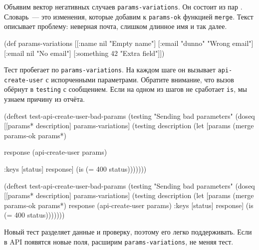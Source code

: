 Объявим вектор негативных случаев \verb|params-variations|. Он состоит из пар
. Словарь~--- это изменения, которые добавим к
\verb|params-ok| функцией \verb|merge|. Текст описывает проблему: неверная
почта, слишком длинное имя и так далее.

\begin{english}
  \begin{clojure}
(def params-variations
  [[{:name nil}      "Empty name"]
   [{:email "dunno"} "Wrong email"]
   [{:email nil}     "No email"]
   [{:something 42}  "Extra field"]])
  \end{clojure}
\end{english}

Тест пробегает по \verb|params-variations|. На каждом шаге он вызывает
\verb|api-create-user| с испорченными параметрами. Обратите внимание, что вызов
обёрнут в \verb|testing| с сообщением. Если на одном из шагов не сработает
\verb|is|, мы узнаем причину из отчёта.

\ifnarrow

\begin{english}
  \begin{clojure}
(deftest test-api-create-user-bad-params
  (testing "Sending bad parameters"
    (doseq [[params* description]
            params-variations]
      (testing description
        (let [params
              (merge params-ok params*)

              response
              (api-create-user params)

              {:keys [status]} response]
          (is (= 400 status)))))))
  \end{clojure}
\end{english}

\else

\begin{english}
  \begin{clojure}
(deftest test-api-create-user-bad-params
  (testing "Sending bad parameters"
    (doseq [[params* description] params-variations]
      (testing description
        (let [params (merge params-ok params*)
              response (api-create-user params)
              {:keys [status]} response]
          (is (= 400 status)))))))
  \end{clojure}
\end{english}

\fi

Новый тест разделяет данные и проверку, поэтому его легко поддерживать. Если в
API появятся новые поля, расширим \verb|params-variations|, не меняя тест.


